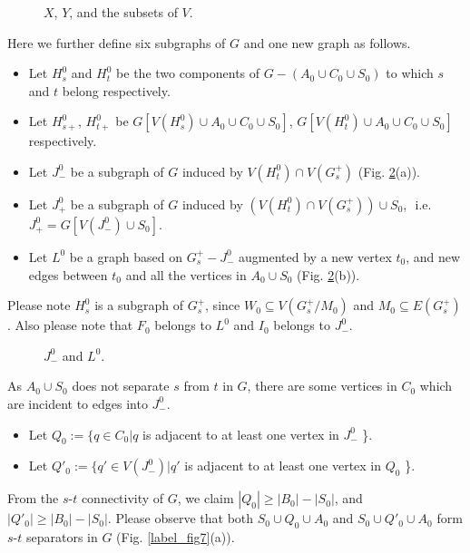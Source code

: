 \documentclass{article}
\begin{document}
\begin{figure}\begin{center}
\caption[Fig5]{$X$, $Y$, and the subsets of $V$.}
\label{label_fig5}
\end{center}\end{figure}

Here we further define six subgraphs of $G$ and one new graph as follows.
\begin{itemize}
\item Let $H_s^0$ and $H_t^0$ be the two components of $G - (A_0 \cup C_0 \cup S_0)$ to which $s$ and $t$ belong respectively.
\item Let $H_{s+}^0$, $H_{t+}^0$ be $G[V(H_s^0)\cup A_0 \cup C_0 \cup S_0]$, $G[V(H_t^0)\cup A_0 \cup C_0 \cup S_0]$
 respectively.
\item Let $J_-^0$ be a subgraph of $G$ induced by $V(H_t^0) \cap V(G_s^+)$ (Fig. \ref{label_fig6}(a)).
\item Let $J_+^0$ be a subgraph of $G$ induced by $\left(V(H_t^0) \cap V(G_s^+)\right) \cup S_0$,\,\,
i.e. $J_+^0 = G[V(J_-^0)\cup S_0]$.
\item Let $L^0$ be a graph based on $G_s^+ - J_-^0$ augmented by a new vertex $t_0$,
and new edges between $t_0$ and all the vertices in $A_0 \cup S_0$ (Fig. \ref{label_fig6}(b)).
\end{itemize}
Please note $H_s^0$ is a subgraph of $G_s^+$,
since $W_0 \subseteq V(G_s^+/M_0)$ and $M_0 \subseteq E(G_s^+)$.
Also please note that $F_0$ belongs to $L^0$ and $I_0$ belongs to $J_-^0$.

\begin{figure}\begin{center}
\caption[Fig6]{$J_-^0$ and $L^0$.}
\label{label_fig6}
\end{center}\end{figure}

As $A_0 \cup S_0$ does not separate $s$ from $t$ in $G$, there are some vertices in $C_0$ which are
incident to edges into $J_-^0$.
\begin{itemize}
\item Let $Q_0  := \{q\in C_0 | q$ is adjacent to at least one vertex in $J_-^0$ \}.
\item Let $Q'_0 := \{q'\in V(J_-^0) | q'$ is adjacent to at least one vertex in $Q_0$ \}.
\end{itemize}
From the $s$-$t$ connectivity of $G$, we claim $|Q_0|\ge |B_0|-|S_0|$, and $|Q'_0|\ge |B_0|-|S_0|$.
Please observe that both $S_0\cup Q_0 \cup A_0$ and $S_0\cup Q'_0 \cup A_0$ form $s$-$t$ separators in $G$
(Fig. \ref{label_fig7}(a)).
\end{document}
